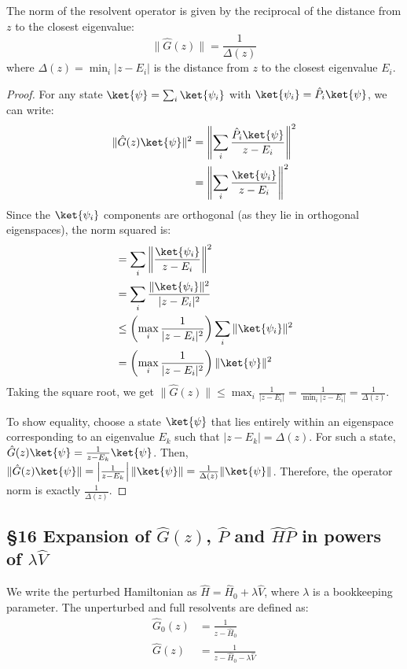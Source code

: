\begin{theorem}
  The norm of the resolvent operator is given by the reciprocal of
  the distance from $z$ to the closest eigenvalue:
  \begin{equation} \label{eq:resolvent_norm}
    \|\hat G(z)\|=\frac{1}{\Delta(z)}
  \end{equation}
  where $\Delta(z) = \min_i |z-E_i|$ is the distance from $z$ to
  the closest eigenvalue $E_i$.
\end{theorem}
\begin{proof}
  For any state $\ket{\psi} = \sum_i \ket{\psi_i}$ with
  $\ket{\psi_i}=\hat P_i\ket{\psi}$, we can write:
  \begin{align}
    \|\hat G(z)\ket{\psi}\|^2 &= \left\|\sum_i \frac{\hat P_i
    \ket{\psi}}{z-E_i}\right\|^2 \\
    &= \left\|\sum_i \frac{\ket{\psi_i}}{z-E_i}\right\|^2 \notag
  \end{align}
  Since the $\ket{\psi_i}$ components are orthogonal (as they lie
  in orthogonal eigenspaces), the norm squared is:
  \begin{align}
    &= \sum_i \left\|\frac{\ket{\psi_i}}{z-E_i}\right\|^2 \notag \\
    &= \sum_i \frac{\|\ket{\psi_i}\|^2}{|z-E_i|^2} \notag \\
    &\le \left(\max_i \frac{1}{|z-E_i|^2}\right) \sum_i
    \|\ket{\psi_i}\|^2 \notag \\
    &= \left(\max_i \frac{1}{|z-E_i|^2}\right)\|\ket{\psi}\|^2 \notag
  \end{align}
  Taking the square root, we get $\|\hat G(z)\|\le \max_i
  \frac{1}{|z-E_i|} = \frac{1}{\min_i |z-E_i|} = \frac{1}{\Delta(z)}$.

  To show equality, choose a state $\ket{\psi}$ that lies entirely
  within an eigenspace corresponding to an eigenvalue $E_k$ such
  that $|z-E_k| = \Delta(z)$. For such a state, $\hat
  G(z)\ket{\psi} = \frac{1}{z-E_k}\ket{\psi}$.
  Then, $\|\hat G(z)\ket{\psi}\| = \left|\frac{1}{z-E_k}\right|
  \|\ket{\psi}\| = \frac{1}{\Delta(z)} \|\ket{\psi}\|$.
  Therefore, the operator norm is exactly $\frac{1}{\Delta(z)}$.
\end{proof}

\hr
\subsection{§16 Expansion of $\hat G(z)$, $\hat P$ and $\hat H \hat
P$ in powers of $\lambda \hat V$}
\begin{definition}
  We write the perturbed Hamiltonian as $\hat H=\hat H_0+\lambda
  \hat V$, where $\lambda$ is a bookkeeping parameter. The
  unperturbed and full resolvents are defined as:
  \begin{align} \label{eq:unperturbed_resolvent}
    \hat G_0(z) &=\frac{1}{z-\hat H_0} \\
    \hat G(z) &=\frac{1}{z-\hat H_0-\lambda \hat V}
  \end{align}
\end{definition}

